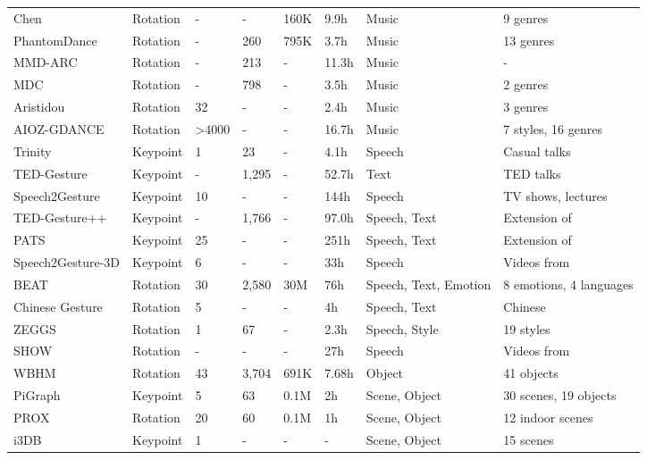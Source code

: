 \begin{table}[htbp]
\begin{tabular}{L{0.18\textwidth} C{0.115\textwidth} C{0.07\textwidth} C{0.08\textwidth} C{0.06\textwidth} C{0.06\textwidth} C{0.13\textwidth} L{0.17\textwidth}}
Chen \cite{ChenTLZGZ021} & Rotation & - & - & 160K & 9.9h & Music & 9 genres \\
PhantomDance \cite{LiZZS22} & Rotation & - & 260 & 795K & 3.7h & Music & 13 genres \\
MMD-ARC \cite{GaoPZSZ22} & Rotation & - & 213 & - & 11.3h & Music & - \\
MDC \cite{Wang0WXCMCW22} & Rotation & - & 798 & - & 3.5h & Music & 2 genres \\
Aristidou \cite{AristidouYACSC23} & Rotation & 32 & - & - & 2.4h & Music & 3 genres \\
AIOZ-GDANCE \cite{LePDTT023} & Rotation & >4000 & - & - & 16.7h & Music & 7 styles, 16 genres \\
Trinity \cite{FerstlM18} & Keypoint & 1 & 23 & - & 4.1h & Speech & Casual talks\\
TED-Gesture \cite{YoonKJLKL19} & Keypoint & - & 1,295 & - & 52.7h & Text & TED talks \\
Speech2Gesture \cite{GinosarBKCOM19} & Keypoint & 10 & - & - & 144h & Speech & TV shows, lectures \\
TED-Gesture++ \cite{YoonCLJLKL20} & Keypoint & - & 1,766 & - & 97.0h & Speech, Text & Extension of \cite{YoonKJLKL19} \\
PATS \cite{AhujaLNM20} & Keypoint & 25 & - & - & 251h & Speech, Text & Extension of \cite{GinosarBKCOM19} \\
Speech2Gesture-3D \cite{HabibieXMLSPET21} & Keypoint & 6 & - & - & 33h & Speech & Videos from \cite{GinosarBKCOM19}\\
BEAT \cite{LiuZIPLZBZ22} & Rotation & 30 & 2,580 & 30M & 76h & Speech, Text, Emotion & 8 emotions, 4 languages \\
Chinese Gesture \cite{AoGLCL22} & Rotation & 5 & - & - & 4h & Speech, Text & Chinese \\
ZEGGS \cite{GhorbaniFHTC23} & Rotation & 1 & 67 & - & 2.3h & Speech, Style & 19 styles \\
SHOW \cite{YiLLCWBTB23} & Rotation & - & - & - & 27h & Speech & Videos from \cite{GinosarBKCOM19} \\
WBHM \cite{ManderyTDVA15} & Rotation & 43 & 3,704 & 691K & 7.68h & Object & 41 objects \\
PiGraph \cite{Hanrahan16a} & Keypoint & 5 & 63 & 0.1M & 2h & Scene, Object & 30 scenes, 19 objects \\
PROX \cite{HassanCTB19} & Rotation & 20 & 60 & 0.1M & 1h & Scene, Object & 12 indoor scenes\\
i3DB \cite{MonszpartGCYM19} & Keypoint & 1 & - & - & - & Scene, Object & 15 scenes\\

\end{tabular}
\end{table}
